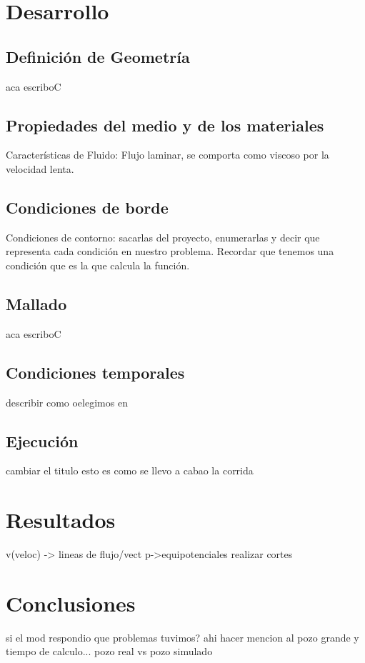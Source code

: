 \documentclass[10pt,a4paper,final]{article}
\begin{document}
\section{Desarrollo}
%
\subsection{Definición de Geometría}
aca escriboC
%
\subsection{Propiedades del medio y de los materiales}
Características de Fluido: Flujo laminar, se comporta como viscoso por
la velocidad lenta.

%
\subsection{Condiciones de borde}
Condiciones de contorno: sacarlas del proyecto, enumerarlas y decir
que representa cada condición en nuestro problema. Recordar que
tenemos una condición que es la que calcula la función.
%
\subsection{Mallado}
aca escriboC
%
\subsection{Condiciones temporales}
describir como oelegimos en
%
%
\subsection{Ejecución}
cambiar el titulo esto es como se llevo a cabao la corrida
\section{Resultados}
v(veloc) -> lineas de flujo/vect
p->equipotenciales
realizar cortes
\section{Conclusiones}
si el mod respondio
que problemas tuvimos? ahi hacer mencion al pozo grande y tiempo de calculo...
pozo real vs pozo simulado
\end{document}

